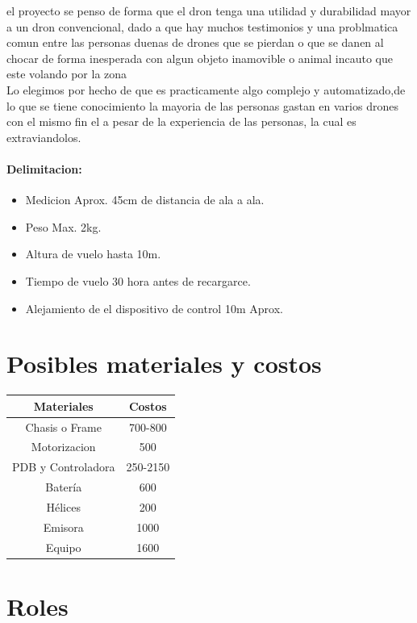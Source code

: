 \documentclass[11pt,a4paper]{article}
\begin{document}
el proyecto se penso de forma que el dron tenga una utilidad y durabilidad mayor a un dron convencional, dado a que hay muchos testimonios y una problmatica comun entre las personas duenas de drones que se pierdan o que se danen al chocar de forma inesperada con algun objeto inamovible o animal incauto que este volando por la zona   \\
Lo elegimos por hecho de que es practicamente algo complejo y automatizado,de lo que se tiene conocimiento la mayoria de las personas gastan en varios drones con el mismo fin el a pesar de la experiencia de las personas, la cual es extraviandolos. 

\paragraph{Delimitacion:}


\begin{itemize}
\item Medicion Aprox. 45cm de distancia de ala a ala.
\item Peso Max. 2kg.
\item Altura de vuelo hasta 10m.
\item Tiempo de vuelo 30 hora antes de recargarce.
\item Alejamiento de el dispositivo de control 10m Aprox.
\end{itemize} 

\section{Posibles materiales y costos}

\begin{tabular}{|c|c|}
\hline
\textbf{Materiales} & \textbf{Costos}\\ \hline
Chasis o Frame & 700-800 \\ \hline
Motorizacion & 500 \\ \hline
PDB y Controladora & 250-2150 \\ \hline
Batería & 600 \\ \hline
Hélices & 200 \\ \hline
Emisora & 1000 \\ \hline
Equipo & 1600 \\ \hline
\end{tabular}



\section{Roles}
\end{document}
